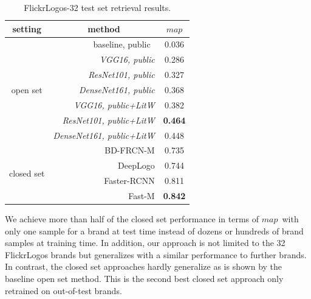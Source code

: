 \documentclass[a4paper,twoside]{article}
\newcommand{\map}{$\mathit{map}$}
\begin{document}
\begin{table}[t]
\centering
\begingroup	
\setlength{\tabcolsep}{6pt}
\caption{FlickrLogos-32 test set retrieval results.}
\label{tab:mapFlickr}
\begin{small}
\begin{tabular}{crc}
\textbf{setting} & \multicolumn{1}{c}{\textbf{method}} & \textbf{\map} \bigstrut[b]\\
\hline
\multirow{7}[2]{*}{\begin{sideways}open set\end{sideways}} & baseline, public~\cite{su2016} & 0.036 \bigstrut[t]\\
      & \textit{VGG16, public} & 0.286 \\
      & \textit{ResNet101, public} & 0.327 \\
      & \textit{DenseNet161, public} & 0.368 \\
\cline{2-3}      
      & \textit{VGG16, public+\ac{LitW}} & 0.382 \bigstrut[t]\\
      & \textit{ResNet101, public+\ac{LitW}} & \textbf{0.464} \\
      & \textit{DenseNet161, public+\ac{LitW}} & 0.448  \bigstrut[b]\\      
\hline
\multirow{4}[1]{*}{\begin{sideways}closed set\end{sideways}} & BD-FRCN-M \cite{oliveira2016} & 0.735 \bigstrut[t]\\	
      & DeepLogo \cite{iandola2015} & 0.744 \\ 
      & Faster-RCNN \cite{su2016} & 0.811 \\
      & Fast-M \cite{bao2016} & \textbf{0.842} \\
\end{tabular}%
\end{small}
\endgroup
\end{table}
We achieve more than half of the closed set performance in terms of \map~with only one sample for a brand at test time instead of dozens or hundreds of brand samples at training time. In addition, our approach is not limited to the 32 FlickrLogos brands but generalizes with a similar performance to further brands. In contrast, the closed set approaches hardly generalize as is shown by the baseline open set method. This is the second best closed set approach only retrained on out-of-test brands.
\end{document}
